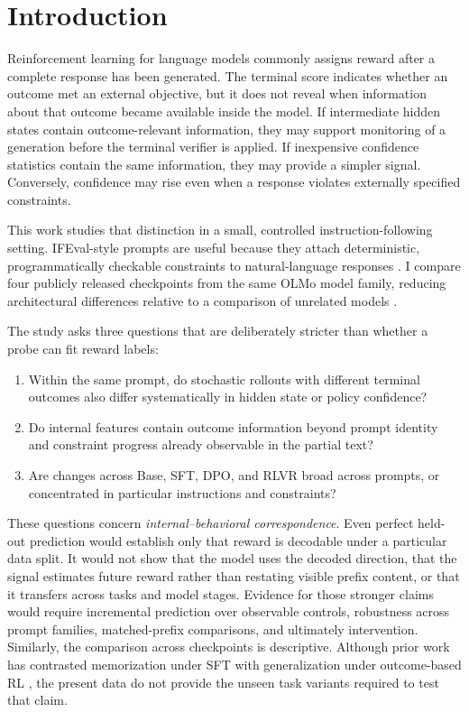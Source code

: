 \documentclass[manuscript,screen,nonacm]{acmart}
\begin{document}
\clearpage

\section{Introduction}

Reinforcement learning for language models commonly assigns reward after a
complete response has been generated. The terminal score indicates whether an
outcome met an external objective, but it does not reveal when information
about that outcome became available inside the model. If intermediate hidden
states contain outcome-relevant information, they may support monitoring of a
generation before the terminal verifier is applied. If inexpensive confidence
statistics contain the same information, they may provide a simpler signal.
Conversely, confidence may rise even when a response violates externally
specified constraints.

This work studies that distinction in a small, controlled instruction-following
setting. IFEval-style prompts are useful because they attach deterministic,
programmatically checkable constraints to natural-language responses
\citep{zhou2023ifeval}. I compare four publicly released checkpoints from the
same OLMo model family, reducing architectural differences relative to a
comparison of unrelated models \citep{groeneveld2024olmo,olmo3card}.

The study asks three questions that are deliberately stricter than whether a
probe can fit reward labels:

\begin{enumerate}
    \item Within the same prompt, do stochastic rollouts with different
    terminal outcomes also differ systematically in hidden state or policy
    confidence?
    \item Do internal features contain outcome information beyond prompt
    identity and constraint progress already observable in the partial text?
    \item Are changes across Base, SFT, DPO, and RLVR broad across prompts, or
    concentrated in particular instructions and constraints?
\end{enumerate}

These questions concern \emph{internal--behavioral correspondence}. Even
perfect held-out prediction would establish only that reward is decodable
under a particular data split. It would not show that the model uses the
decoded direction, that the signal estimates future reward rather than
restating visible prefix content, or that it transfers across tasks and model
stages. Evidence for those stronger claims would require incremental prediction
over observable controls, robustness across prompt families, matched-prefix
comparisons, and ultimately intervention. Similarly, the comparison across
checkpoints is descriptive. Although prior work has contrasted memorization
under SFT with generalization under outcome-based RL \citep{chu2025sft}, the
present data do not provide the unseen task variants required to test that
claim.
\end{document}
